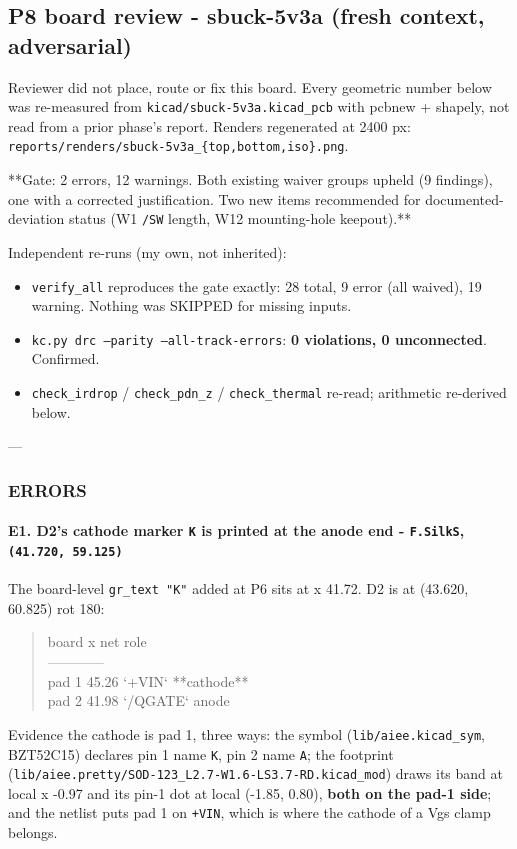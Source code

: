 \documentclass[11pt,a4paper]{article}
\begin{document}
\subsection*{P8 board review - sbuck-5v3a (fresh context, adversarial)}
Reviewer did not place, route or fix this board. Every geometric number below was re-measured from \texttt{kicad/sbuck-5v3a.kicad\_pcb} with pcbnew + shapely, not read from a prior phase's report. Renders regenerated at 2400 px: \texttt{reports/renders/sbuck-5v3a\_\{top,bottom,iso\}.png}.

{*}{*}Gate: 2 errors, 12 warnings. Both existing waiver groups upheld (9 findings), one with a corrected justification. Two new items recommended for documented-deviation status (W1 \texttt{/SW} length, W12 mounting-hole keepout).{*}{*}

Independent re-runs (my own, not inherited):

\begin{itemize}
\item \texttt{verify\_all} reproduces the gate exactly: 28 total, 9 error (all waived), 19 warning.
Nothing was SKIPPED for missing inputs.
\item \texttt{kc.py drc --parity --all-track-errors}: \textbf{0 violations, 0 unconnected}. Confirmed.
\item \texttt{check\_irdrop} / \texttt{check\_pdn\_z} / \texttt{check\_thermal} re-read; arithmetic re-derived below.
\end{itemize}
---

\subsubsection*{ERRORS}
\paragraph*{E1. D2's cathode marker \texttt{K} is printed at the anode end - \texttt{F.SilkS}, \texttt{(41.720, 59.125)}}
The board-level \texttt{gr\_text "K"} added at P6 sits at x 41.72. D2 is at (43.620, 60.825) rot 180:

\begin{quote}\small\ttfamily\raggedright
\textbar{} \textbar{} board x \textbar{} net \textbar{} role \textbar{}\\
\textbar{}---\textbar{}---\textbar{}---\textbar{}---\textbar{}\\
\textbar{} pad 1 \textbar{} 45.26 \textbar{} `+VIN` \textbar{} {*}{*}cathode{*}{*} \textbar{}\\
\textbar{} pad 2 \textbar{} 41.98 \textbar{} `/QGATE` \textbar{} anode \textbar{}
\end{quote}
Evidence the cathode is pad 1, three ways: the symbol (\texttt{lib/aiee.kicad\_sym}, BZT52C15) declares pin 1 name \texttt{K}, pin 2 name \texttt{A}; the footprint (\texttt{lib/aiee.pretty/SOD-123\_L2.7-W1.6-LS3.7-RD.kicad\_mod}) draws its band at local x -0.97 and its pin-1 dot at local (-1.85, 0.80), \textbf{both on the pad-1 side}; and the netlist puts pad 1 on \texttt{+VIN}, which is where the cathode of a Vgs clamp belongs.
\end{document}
